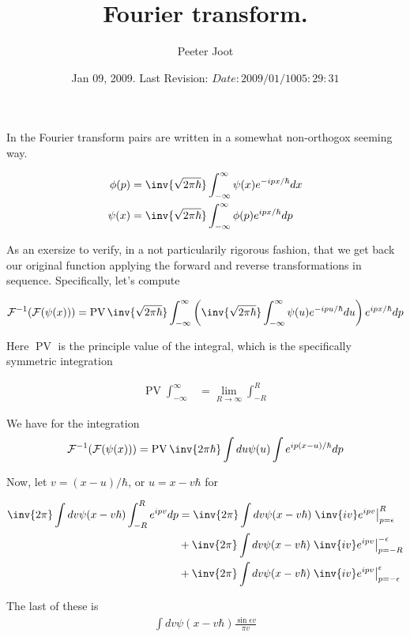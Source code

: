 \documentclass{article}
\title{ Fourier transform. }
\author{Peeter Joot}
\date{ Jan 09, 2009.  Last Revision: $Date: 2009/01/10 05:29:31 $ }
\newcommand{\FF}[0]{\mathcal{F}}
\DeclareMathOperator{\PV}{PV}
\begin{document}
\maketitle{}

In \cite{mcmahon2005qmd} the Fourier transform pairs are written in a somewhat 
non-orthogox seeming way.

\begin{align*}
\phi(p) &= \inv{\sqrt{2\pi\hbar}} \int_{-\infty}^\infty \psi(x) e^{-ipx/\hbar} dx \\
\psi(x) &= \inv{\sqrt{2\pi\hbar}} \int_{-\infty}^\infty \phi(p) e^{ipx/\hbar} dp \\
\end{align*}

As an exersize to verify, in a not particularily rigorous fashion, that we get back our original function applying the forward and reverse transformations
in sequence.  Specifically, let's compute

\begin{align*}
\FF^{-1}(\FF(\psi(x)))
&= \PV \inv{\sqrt{2\pi\hbar}} \int_{-\infty}^\infty \left(\inv{\sqrt{2\pi\hbar}} \int_{-\infty}^\infty \psi(u) e^{-ipu/\hbar} du \right) e^{ipx/\hbar} dp \\
\end{align*}

Here $\PV$ is the principle value of the integral, which is the specifically symmetric integration

\begin{align*}
\PV \int_{-\infty}^\infty &= \lim_{R \rightarrow \infty} \int_{-R}^R
\end{align*}

We have for the integration
\begin{align*}
\FF^{-1}(\FF(\psi(x)))
&= \PV \inv{{2\pi\hbar}} \int du \psi(u) \int e^{i p (x-u)/\hbar} dp \\
\end{align*}

Now, let $v = (x-u)/\hbar$, or $u=x-v\hbar$ for

\begin{align*}
\inv{{2\pi}} \int dv \psi(x -v\hbar) \int_{-R}^R e^{i p v} dp 
&=
\inv{{2\pi}} \int dv \psi(x - v\hbar) \left. \inv{i v} e^{i p v} \right\vert_{p=\epsilon}^R \\
&+\inv{{2\pi}} \int dv \psi(x - v\hbar) \left. \inv{i v} e^{i p v} \right\vert_{p=-R}^{-\epsilon} \\
&+\inv{{2\pi}} \int dv \psi(x - v\hbar) \left. \inv{i v} e^{i p v} \right\vert_{p=-\epsilon}^{\epsilon} \\
\end{align*}

The last of these is
\begin{align*}
\int dv \psi(x - v\hbar) \frac{\sin{\epsilon v}}{\pi v} 
\end{align*}



\end{document}
